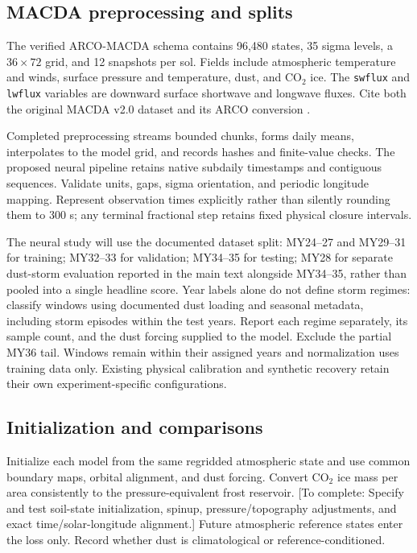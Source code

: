 \documentclass{article}
\newcommand{\pending}[1]{\textcolor{blue!65!black}{[To complete: #1]}}
\begin{document}
\subsection{MACDA preprocessing and splits}
The verified ARCO-MACDA schema contains 96,480 states, 35 sigma levels, a
\(36\times72\) grid, and 12 snapshots per sol. Fields include atmospheric
temperature and winds, surface pressure and temperature, dust, and CO$_2$ ice.
The \texttt{swflux} and \texttt{lwflux} variables are downward surface shortwave
and longwave fluxes. Cite both the original MACDA v2.0 dataset and its ARCO
conversion \citep{valeanu2026macda,bhattacharya2026arcomars}.

Completed preprocessing streams bounded chunks, forms daily means, interpolates
to the model grid, and records hashes and finite-value checks. The proposed
neural pipeline retains native subdaily timestamps and contiguous sequences.
Validate units, gaps, sigma orientation, and periodic longitude mapping.
Represent observation times explicitly rather than silently rounding them to
300 s; any terminal fractional step retains fixed physical closure intervals.

The neural study will use the documented dataset split: MY24--27 and MY29--31
for training; MY32--33 for validation; MY34--35 for testing; MY28 for separate
dust-storm evaluation reported in the main text alongside MY34--35, rather than
pooled into a single headline score. Year labels alone do not define storm
regimes: classify windows using documented dust loading and seasonal metadata,
including storm episodes within the test years. Report each regime separately,
its sample count, and the dust forcing supplied to the model. Exclude the partial MY36 tail. Windows remain within
their assigned years and normalization uses training data only.
Existing physical calibration and synthetic recovery retain their own
experiment-specific configurations.

\subsection{Initialization and comparisons}
Initialize each model from the same regridded atmospheric state and use common
boundary maps, orbital alignment, and dust forcing. Convert CO$_2$ ice mass
per area consistently to the pressure-equivalent frost reservoir.
\pending{Specify and test soil-state initialization, spinup, pressure/topography
adjustments, and exact time/solar-longitude alignment.}
Future atmospheric reference states enter the loss only. Record whether dust
is climatological or reference-conditioned.
\end{document}
